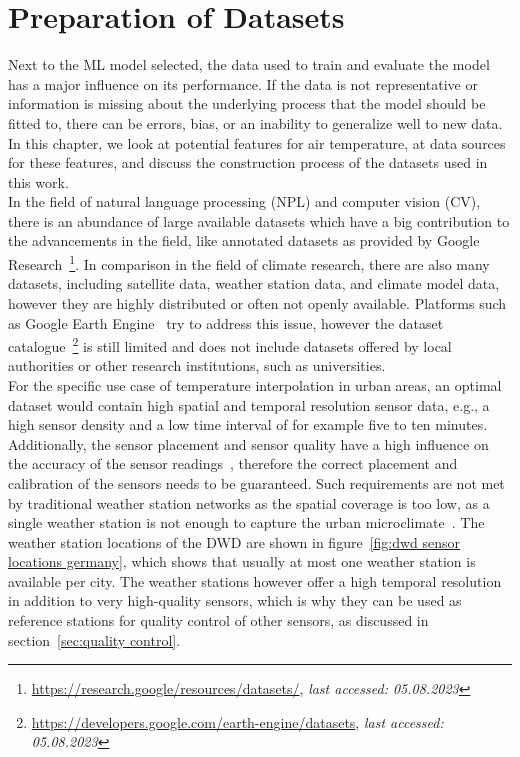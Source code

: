 \chapter{Preparation of Datasets}
\label{chap:preparations data sets}

Next to the ML model selected, the data used to train and evaluate the model has a major influence on its performance. If the data is not representative or information is missing about the underlying process that the model should be fitted to, there can be errors, bias, or an inability to generalize well to new data. In this chapter, we look at potential features for air temperature, at data sources for these features, and discuss the construction process of the datasets used in this work.\\
In the field of natural language processing (NPL) and computer vision (CV), there is an abundance of large available datasets which have a big contribution to the advancements in the field, like annotated datasets as provided by Google Research~\footnote{\url{https://research.google/resources/datasets/}, \textit{last accessed: 05.08.2023}}. In comparison in the field of climate research, there are also many datasets, including satellite data, weather station data, and climate model data, however they are highly distributed or often not openly available. Platforms such as Google Earth Engine~\cite{gorelick2017google} try to address this issue, however the dataset catalogue~\footnote{\url{https://developers.google.com/earth-engine/datasets}, \textit{last accessed: 05.08.2023}} is still limited and does not include datasets offered by local authorities or other research institutions, such as universities.\\
For the specific use case of temperature interpolation in urban areas, an optimal dataset would contain high spatial and temporal resolution sensor data, e.g., a high sensor density and a low time interval of for example five to ten minutes. Additionally, the sensor placement and sensor quality have a high influence on the accuracy of the sensor readings~\cite{oke2006guideline}, therefore the correct placement and calibration of the sensors needs to be guaranteed. Such requirements are not met by traditional weather station networks as the spatial coverage is too low, as a single weather station is not enough to capture the urban microclimate~\cite{oke2017urban}. The weather station locations of the DWD are shown in figure~\ref{fig:dwd sensor locations germany}, which shows that usually at most one weather station is available per city. The weather stations however offer a high temporal resolution in addition to very high-quality sensors, which is why they can be used as reference stations for quality control of other sensors, as discussed in section~\ref{sec:quality control}.\\
